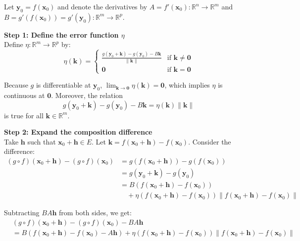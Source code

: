 \documentclass[12pt]{article}
\begin{document}
\begin{dbox}
\begin{pf}
Let $\mathbf{y}_0 = f(\mathbf{x}_0)$ and denote the derivatives by $A = f'(\mathbf{x}_0): \mathbb{R}^n \to \mathbb{R}^m$ and $B = g'(f(\mathbf{x}_0)) = g'(\mathbf{y}_0): \mathbb{R}^m \to \mathbb{R}^p$.

\vspace{0.8em}
\noindent \textbf{Step 1: Define the error function $\eta$} \\
Define $\eta: \mathbb{R}^m \to \mathbb{R}^p$ by:
$$
\eta(\mathbf{k}) = 
\begin{cases}
\frac{g(\mathbf{y}_0+\mathbf{k}) - g(\mathbf{y}_0) - B\mathbf{k}}{\|\mathbf{k}\|} & \text{if } \mathbf{k} \ne \mathbf{0} \\
\mathbf{0} & \text{if } \mathbf{k} = \mathbf{0}
\end{cases}
$$ 

Because $g$ is differentiable at $\mathbf{y}_0$, $\lim_{\mathbf{k} \to \mathbf{0}} \eta(\mathbf{k}) = \mathbf{0}$, which implies $\eta$ is continuous at $\mathbf{0}$.
Moreover, the relation
$$g(\mathbf{y}_0+\mathbf{k}) - g(\mathbf{y}_0) - B\mathbf{k} = \eta(\mathbf{k}) \|\mathbf{k}\|$$
is true for all $\mathbf{k} \in \mathbb{R}^m$.

\vspace{0.8em}
\noindent \textbf{Step 2: Expand the composition difference} \\
Take $\mathbf{h}$ such that $\mathbf{x}_0+\mathbf{h} \in E$. Let $\mathbf{k} = f(\mathbf{x}_0+\mathbf{h}) - f(\mathbf{x}_0)$.
Consider the difference:
\begin{align*}
(g \circ f)(\mathbf{x}_0+\mathbf{h}) - (g \circ f)(\mathbf{x}_0) 
&= g(f(\mathbf{x}_0+\mathbf{h})) - g(f(\mathbf{x}_0)) \\
&= g(\mathbf{y}_0+\mathbf{k}) - g(\mathbf{y}_0) \\
&= B(f(\mathbf{x}_0+\mathbf{h}) - f(\mathbf{x}_0)) \\
&\quad + \eta(f(\mathbf{x}_0+\mathbf{h}) - f(\mathbf{x}_0)) \|f(\mathbf{x}_0+\mathbf{h}) - f(\mathbf{x}_0)\|
\end{align*}

Subtracting $BA\mathbf{h}$ from both sides, we get:
\begin{align*}
&(g \circ f)(\mathbf{x}_0+\mathbf{h}) - (g \circ f)(\mathbf{x}_0) - BA\mathbf{h} \\
&= B(f(\mathbf{x}_0+\mathbf{h}) - f(\mathbf{x}_0) - A\mathbf{h}) + \eta(f(\mathbf{x}_0+\mathbf{h}) - f(\mathbf{x}_0)) \|f(\mathbf{x}_0+\mathbf{h}) - f(\mathbf{x}_0)\|
\end{align*} 


\end{pf}
\end{dbox}
\end{document}
